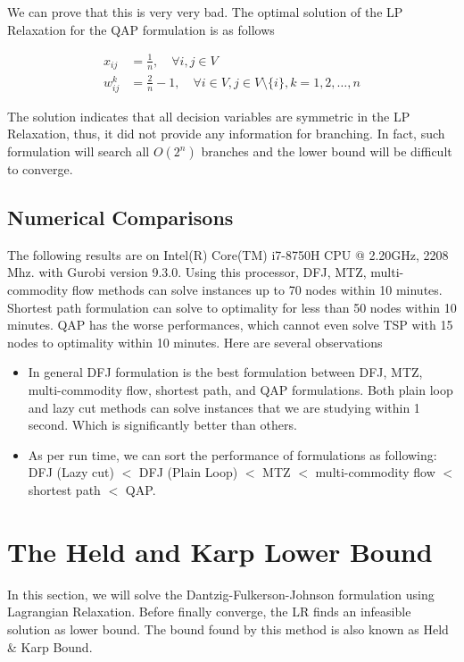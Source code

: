             We can prove that this is very very bad. The optimal solution of the LP Relaxation for the QAP formulation is as follows

            \begin{align}
                x_{ij} &= \frac{1}{n}, \quad \forall i, j \in V\\
                w_{ij}^k &= \frac{2}{n} - 1, \quad \forall i \in V, j \in V \setminus \{i\}, k = 1, 2, \ldots, n
            \end{align}

            The solution indicates that all decision variables are symmetric in the LP Relaxation, thus, it did not provide any information for branching. In fact, such formulation will search all $O(2^n)$ branches and the lower bound will be difficult to converge.

        \subsection{Numerical Comparisons}
            The following results are on Intel(R) Core(TM) i7-8750H CPU @ 2.20GHz, 2208 Mhz. with Gurobi version 9.3.0. Using this processor, DFJ, MTZ, multi-commodity flow methods can solve instances up to 70 nodes within 10 minutes. Shortest path formulation can solve to optimality for less than 50 nodes within 10 minutes. QAP has the worse performances, which cannot even solve TSP with 15 nodes to optimality within 10 minutes. Here are several observations
            \begin{itemize}
                \item In general DFJ formulation is the best formulation between DFJ, MTZ, multi-commodity flow, shortest path, and QAP formulations. Both plain loop and lazy cut methods can solve instances that we are studying within 1 second. Which is significantly better than others.
                \item As per run time, we can sort the performance of formulations as following: DFJ (Lazy cut) $<$ DFJ (Plain Loop) $<$ MTZ $<$ multi-commodity flow $<$ shortest path $<$ QAP.
            \end{itemize}
    
    \section{The Held and Karp Lower Bound}
        In this section, we will solve the Dantzig-Fulkerson-Johnson formulation using Lagrangian Relaxation. Before finally converge, the LR finds an infeasible solution as lower bound. The bound found by this method is also known as Held \& Karp Bound.
        

